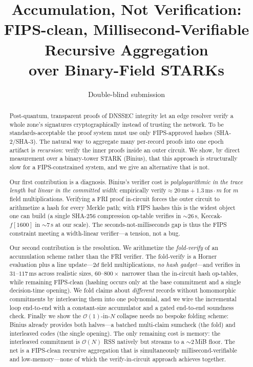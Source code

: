 \documentclass[11pt]{article}
\title{Accumulation, Not Verification:\\
FIPS-clean, Millisecond-Verifiable Recursive Aggregation\\
over Binary-Field STARKs}
\author{Double-blind submission}
\date{}
\newcommand{\bigO}{\mathcal{O}}
\begin{document}
\maketitle

\begin{abstract}
Post-quantum, transparent proofs of DNSSEC integrity let an edge resolver verify
a whole zone's signatures cryptographically instead of trusting the network. To
be standards-acceptable the proof system must use only FIPS-approved hashes
(SHA-2/SHA-3). The natural way to aggregate many per-record proofs into one
epoch artifact is \emph{recursion}: verify the inner proofs inside an outer
circuit. We show, by direct measurement over a binary-tower STARK
(Binius), that this approach is structurally slow for a FIPS-constrained system,
and we give an alternative that is not.

Our first contribution is a diagnosis. Binius's verifier cost is
\emph{polylogarithmic in the trace length but linear in the committed width}:
empirically $\text{verify}\approx 20\,\text{ms} + 1.3\,\text{ms}\cdot m$ for $m$
field multiplications. Verifying a FRI proof in-circuit forces the outer circuit
to arithmetize a hash for every Merkle path; with FIPS hashes this is the widest
object one can build (a single SHA-256 compression op-table verifies in $\sim26$\,s,
Keccak-$f[1600]$ in $\sim7$\,s at our scale). The seconds-not-milliseconds gap is
thus the FIPS constraint meeting a width-linear verifier---a tension, not a bug.

Our second contribution is the resolution. We arithmetize the \emph{fold-verify}
of an accumulation scheme rather than the FRI verifier. The fold-verify is a
Horner evaluation plus a line update---$2d$ field multiplications, \emph{no hash
gadget}---and verifies in $31$--$117$\,ms across realistic sizes, $60$--$800\times$
narrower than the in-circuit hash op-tables, while remaining FIPS-clean (hashing
occurs only at the base commitment and a single decision-time opening). We fold
claims about \emph{different} records without homomorphic commitments by
interleaving them into one polynomial, and we wire the incremental loop
end-to-end with a constant-size accumulator and a gated end-to-end soundness
check. Finally we show the $\bigO(1)$-in-$N$ collapse needs no bespoke folding
scheme: Binius already provides both halves---a batched multi-claim sumcheck
(the fold) and interleaved codes (the single opening). The only remaining cost is
memory: the interleaved commitment is $\bigO(N)$ RSS natively but streams to a
$\sim2$\,MiB floor. The net is a FIPS-clean recursive aggregation that is
simultaneously millisecond-verifiable and low-memory---none of which the
verify-in-circuit approach achieves together.
\end{abstract}
\end{document}
